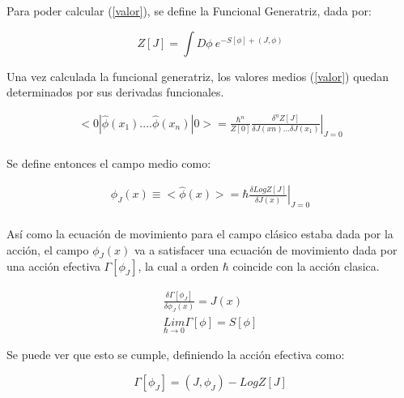 Para poder calcular (\ref{valor}), se define la Funcional Generatriz, dada por:

\begin{equation}
Z [J] = 
\int D \phi \ e ^{- S[ \phi ] + (J, \phi )}
\label{eq.generatriz}
\end{equation}

Una vez calculada la funcional generatriz, los valores medios (\ref{valor}) quedan determinados por sus derivadas funcionales.

\begin{equation}
\begin{array}{c}
< 0 | \hat{ \phi  } (x _1) .... \hat{\phi  } (x _n) | 0 > = \frac{\hbar ^n}{Z[0]}
\left. \frac{\delta ^n  Z[J] }{ \delta J(xn) ... \delta J(x _1) } 		\right| _{J=0}\\[10pt]
\end{array}
\end{equation}


Se define entonces el campo medio como:

\begin{equation}
\begin{array}{c}
\phi _J (x) \equiv < \hat{\phi } (x) > = \hbar \left. \frac{\delta Log Z[J] }{\delta J(x)} \right| _{J=0} \\[10pt]
\end{array}
\end{equation}



Así como la ecuación de movimiento para el campo clásico estaba dada por la acción, el campo $ \phi _J (x) $ va a satisfacer una ecuación de movimiento dada por una acción efectiva $ \Gamma [\phi _J] $, la cual a orden $\hbar$ coincide con la acción clasica.


\begin{equation}
\begin{array}{c}
\frac{\delta \Gamma [ \phi _J ]  }{\delta \phi _J (x)  } = 
J (x) \\[8pt]
\underset{ \hbar \rightarrow 0 }{ Lim  } \Gamma [ \phi  ] = S [ \phi ]
\end{array}
\label{eq.accion1}
\end{equation}

Se puede ver que esto se cumple, definiendo la acción efectiva como:

\begin{equation}
\Gamma [\phi _J] = (J, \phi _J) - Log Z [J]
\label{efectiva}
\end{equation}

